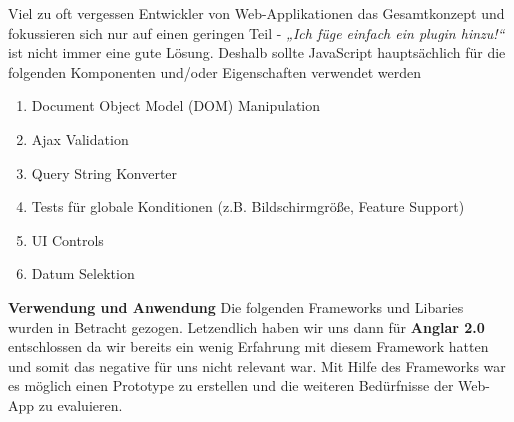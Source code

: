 \begin{description}
Viel zu oft vergessen Entwickler von Web-Applikationen das Gesamtkonzept und fokussieren sich nur auf einen geringen Teil - \textit{„Ich füge einfach ein plugin hinzu!“} ist nicht immer eine gute Lösung. Deshalb sollte JavaScript hauptsächlich für die folgenden Komponenten und/oder Eigenschaften verwendet werden
\begin{enumerate}
\item Document Object Model (DOM) Manipulation
\item Ajax Validation
\item Query String Konverter
\item Tests für globale Konditionen (z.B. Bildschirmgröße, Feature Support)
\item UI Controls
\item Datum Selektion
\end{enumerate}
\end{description}

\clearpage

\textbf{Verwendung und Anwendung\newline}
Die folgenden Frameworks und Libaries wurden in Betracht gezogen. Letzendlich haben wir uns dann für \textbf{Anglar 2.0} entschlossen da wir bereits ein wenig Erfahrung mit diesem Framework hatten und somit das negative für uns nicht relevant war. Mit Hilfe des Frameworks war es möglich einen Prototype zu erstellen und die weiteren Bedürfnisse der Web-App zu evaluieren.

